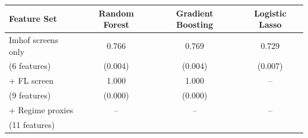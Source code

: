 \begin{tabular}{lccc}
\toprule
Feature Set & Random Forest & Gradient Boosting & Logistic Lasso \\
\midrule
Imhof screens only & 0.766 & 0.769 & 0.729 \\
\quad (6 features) & (0.004) & (0.004) & (0.007) \\
\addlinespace
+ FL screen & 1.000 & 1.000 & -- \\
\quad (9 features) & (0.000) & (0.000) & \\
\addlinespace
+ Regime proxies & -- & -- & -- \\
\quad (11 features) & & & \\
\bottomrule
\end{tabular}
